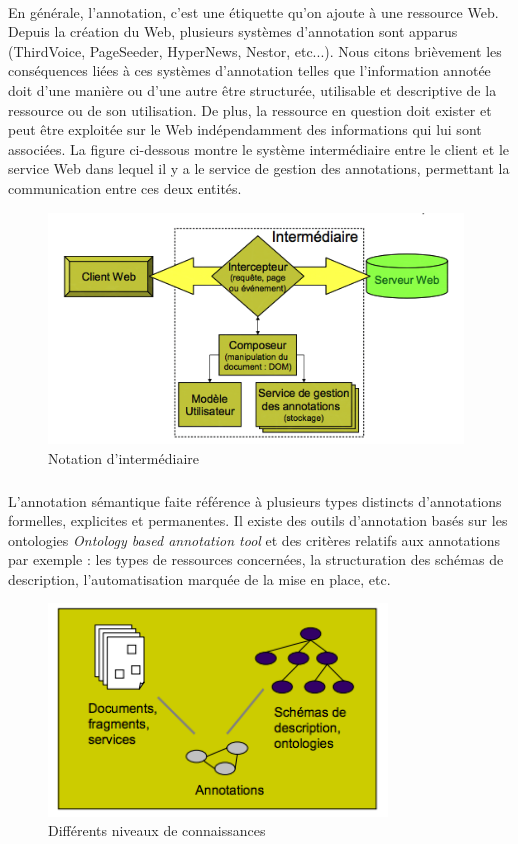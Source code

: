 \documentclass[12pt,a4	]{report}
\begin{document}
\paragraph{}
En générale, l'annotation, c'est une étiquette qu'on ajoute à une ressource Web. Depuis la création du Web, plusieurs systèmes d'annotation sont apparus (ThirdVoice, PageSeeder, HyperNews, Nestor, etc...).
Nous citons brièvement les conséquences liées à ces systèmes d'annotation telles que l'information annotée doit d'une manière ou d'une autre être structurée, utilisable et descriptive de la ressource ou de son utilisation. De plus, la ressource en question doit exister et peut être exploitée sur le Web indépendamment des informations qui lui sont associées. La figure ci-dessous montre le système intermédiaire entre le client et le service Web dans lequel il y a le service de gestion des annotations, permettant la communication entre ces deux entités.
\begin{figure}[H]
\centering
\includegraphics[width=11cm]{AnnotationSys.png}
\caption{Notation d'intermédiaire}
\end{figure}
\subparagraph{}
L'annotation sémantique faite référence à plusieurs types distincts d'annotations formelles, explicites et permanentes. Il existe des outils d'annotation basés sur les ontologies {\it Ontology based annotation tool}
et des critères relatifs aux annotations par exemple : les types de ressources concernées, la structuration des schémas de description, l'automatisation marquée de la mise en place, etc.
\begin{figure}[H]
\centering
\includegraphics[width=9cm]{diffConnaissances.png}
\caption{Différents niveaux de connaissances}
\end{figure}
\end{document}
